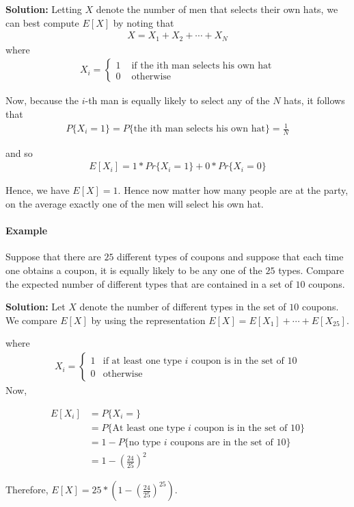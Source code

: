 \documentclass[10 pt,final]{article}
\begin{document}
\textbf{Solution:} Letting $X$ denote the number of men that selects their own hats, we can best compute $E[X]$ by noting that 
\begin{align*}
X = X_1 + X_2 + \cdots + X_N
\end{align*}
where
\begin{align*}
X_i =
\begin{cases}
1 & \mbox{ if the ith man selects his own hat} \\
0 & \mbox{ otherwise}
\end{cases}
\end{align*}

Now, because the $i$-th man is equally likely to select any of the $N$ hats, it follows that 
\begin{align*}
P\{X_i=1\} = P\{\mbox{the ith man selects his own hat}\} = \frac{1}{N}
\end{align*}

and so 
\begin{align*}
E[X_i] = 1*Pr\{X_i = 1\} + 0 * Pr\{X_i = 0\}
\end{align*}

Hence, we have $E[X] = 1$. Hence now matter how many people are at the party, on the average exactly one of the men will select his own hat.



\paragraph{Example} Suppose that there are $25$ different types of coupons and suppose that each time one obtains a coupon, it is equally likely to be any one of the $25$ types. Compare the expected number of different types that are contained in a set of $10$ coupons. 

\textbf{Solution:} Let $X$ denote the number of different types in the set of $10$ coupons. We compare $E[X]$ by using the representation $E[X] = E[X_1] + \cdots + E[X_{25}]$.

where 
\begin{align*}
X_i =
\begin{cases}
1 & \mbox{if at least one type $i$ coupon is in the set of 10} \\
0 & \mbox{otherwise} 
\end{cases}
\end{align*}
Now,

\begin{align*}
E[X_i] & = P\{X_i = \} \\
& = P\{\mbox{At least one type $i$ coupon is in the set of $10$}\} \\
& = 1 - P\{\mbox{no type $i$ coupons are in the set of $10$}\} \\
& = 1 - (\frac{24}{25})^2
\end{align*}

Therefore, $E[X] = 25*(1-(\frac{24}{25})^25)$.
\end{document}
